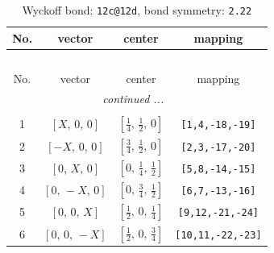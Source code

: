 \documentclass[fleqn,8pt]{jsarticle}
\begin{document}
\begin{longtable}{cccc}
\caption{Wyckoff bond: {\tt 12c@12d}, bond symmetry: {\tt 2.22}}
 \\
 \hline \hline
No. & vector & center & mapping \\ \hline \endfirsthead

\multicolumn{3}{l}{\tablename\ \thetable{}} \\
 \hline \hline
No. & vector & center & mapping \\ \hline \endhead

 \hline \hline
\multicolumn{3}{r}{\footnotesize\it continued ...} \\ \endfoot

 \hline \hline
\multicolumn{3}{r}{} \\ \endlastfoot

1 & $\left[ X,\, 0,\, 0 \right]$ & $\left[ \frac{1}{4},\, \frac{1}{2},\, 0 \right]$ & {\tt [1,4,-18,-19]} \\ \hline
2 & $\left[ - X,\, 0,\, 0 \right]$ & $\left[ \frac{3}{4},\, \frac{1}{2},\, 0 \right]$ & {\tt [2,3,-17,-20]} \\ \hline
3 & $\left[ 0,\, X,\, 0 \right]$ & $\left[ 0,\, \frac{1}{4},\, \frac{1}{2} \right]$ & {\tt [5,8,-14,-15]} \\ \hline
4 & $\left[ 0,\, - X,\, 0 \right]$ & $\left[ 0,\, \frac{3}{4},\, \frac{1}{2} \right]$ & {\tt [6,7,-13,-16]} \\ \hline
5 & $\left[ 0,\, 0,\, X \right]$ & $\left[ \frac{1}{2},\, 0,\, \frac{1}{4} \right]$ & {\tt [9,12,-21,-24]} \\ \hline
6 & $\left[ 0,\, 0,\, - X \right]$ & $\left[ \frac{1}{2},\, 0,\, \frac{3}{4} \right]$ & {\tt [10,11,-22,-23]} \\
\end{longtable}
\renewcommand{\arraystretch}{1.2}
\end{document}
